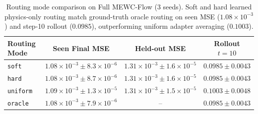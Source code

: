 \documentclass[11pt,a4paper]{article}
\begin{document}
\begin{table}[!htbp]
\centering
\caption{Routing mode comparison on Full MEWC-Flow (3 seeds). Soft and hard learned physics-only routing match ground-truth oracle routing on seen MSE ($1.08 \times 10^{-3}$) and step-10 rollout ($0.0985$), outperforming uniform adapter averaging ($0.1003$).}
\label{tab:routing_modes}
\begin{tabular}{@{}lccc@{}}
\toprule
Routing Mode & Seen Final MSE & Held-out MSE & Rollout $t=10$ \\
\midrule
\texttt{soft} & $1.08 \times 10^{-3} \pm 8.3 \times 10^{-6}$ & $1.31 \times 10^{-3} \pm 1.6 \times 10^{-5}$ & $0.0985 \pm 0.0043$ \\
\texttt{hard} & $1.08 \times 10^{-3} \pm 8.7 \times 10^{-6}$ & $1.31 \times 10^{-3} \pm 1.6 \times 10^{-5}$ & $0.0985 \pm 0.0043$ \\
\texttt{uniform} & $1.09 \times 10^{-3} \pm 1.3 \times 10^{-5}$ & $1.31 \times 10^{-3} \pm 1.5 \times 10^{-5}$ & $0.1003 \pm 0.0048$ \\
\texttt{oracle} & $1.08 \times 10^{-3} \pm 7.9 \times 10^{-6}$ & -- & $0.0985 \pm 0.0043$ \\
\bottomrule
\end{tabular}
\end{table}

\begin{table}[!htbp]
\centering
\caption{Task-order sensitivity across ascending ($240 \to 2520$), descending ($2520 \to 240$), and shuffled ($1280 \to 240 \to 2520 \to 650$) curricula (RQ5, 3 seeds, reported as Avg.\ Forgetting / Final MSE). Ascending order inflicts severe forgetting on Fine-Tuning ($+4.12 \times 10^{-4}$) as high-$Re$ turbulence overwrites smooth laminar modes, whereas both ER and MEWC-Flow maintain negative forgetting across all orders.}
\label{tab:order}
\end{table}
\end{document}
